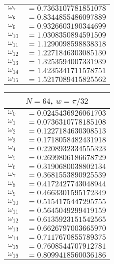 \begin{table}[p]
\begin{minipage}[t]{3in}
\begin{tabular}{l@{}l}
$\omega_{7}$ & ${}=0.7363107781851078$ \\
$\omega_{8}$ & ${}=0.8344855486097889$ \\
$\omega_{9}$ & ${}=0.9326603190344699$ \\
$\omega_{10}$ & ${}=1.0308350894591509$ \\
$\omega_{11}$ & ${}=1.1290098598838318$ \\
$\omega_{12}$ & ${}=1.2271846303085130$ \\
$\omega_{13}$ & ${}=1.3253594007331939$ \\
$\omega_{14}$ & ${}=1.4235341711578751$ \\
$\omega_{15}$ & ${}=1.5217089415825562$ \\
\bottomrule
\end{tabular}%
\end{minipage}%
%
\begin{minipage}[t]{3in}
\null%
\begin{tabular}{l@{}l} \toprule
\multicolumn{2}{c}{$N=64$, $w=\pi / 32$ } \\ \midrule
$\omega_{0}$ & ${}=0.0245436926061703$ \\
$\omega_{1}$ & ${}=0.0736310778185108$ \\
$\omega_{2}$ & ${}=0.1227184630308513$ \\
$\omega_{3}$ & ${}=0.1718058482431918$ \\
$\omega_{4}$ & ${}=0.2208932334555323$ \\
$\omega_{5}$ & ${}=0.2699806186678729$ \\
$\omega_{6}$ & ${}=0.3190680038802134$ \\
$\omega_{7}$ & ${}=0.3681553890925539$ \\
$\omega_{8}$ & ${}=0.4172427743048944$ \\
$\omega_{9}$ & ${}=0.4663301595172349$ \\
$\omega_{10}$ & ${}=0.5154175447295755$ \\
$\omega_{11}$ & ${}=0.5645049299419159$ \\
$\omega_{12}$ & ${}=0.6135923151542565$ \\
$\omega_{13}$ & ${}=0.6626797003665970$ \\
$\omega_{14}$ & ${}=0.7117670855789375$ \\
$\omega_{15}$ & ${}=0.7608544707912781$ \\
$\omega_{16}$ & ${}=0.8099418560036186$ \\

\end{tabular}
\end{minipage}
\end{table}
